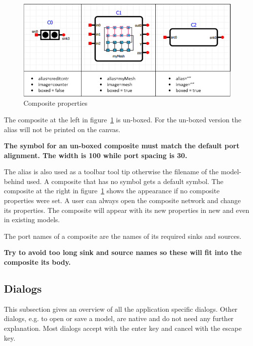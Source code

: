\begin{figure}[here]
\begin{center}	
	\includegraphics[width=.70\linewidth]{pictures/composites}
	\caption{Composite properties}
	\label{fig:composites}
\end{center}
\end{figure}

The composite at the left in figure~\ref{fig:composites} is un-boxed. For the un-boxed
version the alias will not be printed on the canvas.\\

\begin{tcolorbox}[colback=white]
\textbf{
The symbol for an un-boxed composite must match the default port alignment.
The width is 100 while port spacing is 30.
}
\end{tcolorbox}
\vspace{0.1cm}
The alias is also used as a toolbar tool tip otherwise the filename of the
model-behind used. A composite that has no symbol gets a default symbol. The
composite at the right in figure~\ref{fig:composites} shows the appearance if no
composite properties were set. A user can always open the composite network and
change its properties. The composite will appear with its new properties in new
and even in existing models.

The port names of a composite are the names of its required sinks and sources.
\begin{tcolorbox}[colback=white]
\textbf{
Try to avoid too long sink and source names so these will fit into the composite its body.
}
\end{tcolorbox}




\subsection{Dialogs}
This subsection gives an overview of all the application specific dialogs. Other
dialogs, e.g. to open or save a model, are native and do not need any further
explanation.
Most dialogs accept with the enter key and cancel with the escape key.

